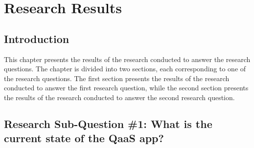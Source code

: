 \chapter{Research Results}
\begin{multicols}{2}
      \section{Introduction}
      This chapter presents the results of the research conducted to answer the research questions. The chapter is
      divided into two sections, each corresponding to one of the research questions. The first section presents
      the results of the research conducted to answer the first research question, while the second section
      presents the results of the research conducted to answer the second research question.

      \section{Research Sub-Question \#1: What is the current state of the QaaS app?}


\end{multicols}
